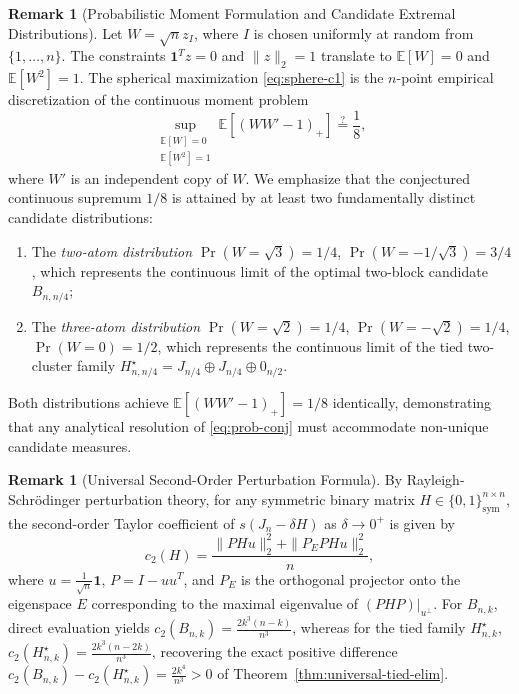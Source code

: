 \documentclass[11pt,reqno]{article}
\theoremstyle{definition}
\newtheorem{remark}[theorem]{Remark}
\newcommand{\one}{\mathbf{1}}
\begin{document}
\begin{itemize}
    \begin{remark}[Probabilistic Moment Formulation and Candidate Extremal Distributions]\label{rem:prob-c1}
    Let $W = \sqrt{n} z_I$, where $I$ is chosen uniformly at random from $\{1, \dots, n\}$. The constraints $\one^T z = 0$ and $\|z\|_2 = 1$ translate to $\mathbb{E}[W] = 0$ and $\mathbb{E}[W^2] = 1$. The spherical maximization \eqref{eq:sphere-c1} is the $n$-point empirical discretization of the continuous moment problem
    \begin{equation}\label{eq:prob-conj}
    \sup_{\substack{\mathbb{E}[W] = 0 \\ \mathbb{E}[W^2] = 1}} \mathbb{E}[(W W' - 1)_+] \stackrel{?}{=} \frac{1}{8},
    \end{equation}
    where $W'$ is an independent copy of $W$. We emphasize that the conjectured continuous supremum $1/8$ is attained by at least two fundamentally distinct candidate distributions:
    \begin{enumerate}
        \item The \emph{two-atom distribution} $\Pr(W = \sqrt{3}) = 1/4$, $\Pr(W = -1/\sqrt{3}) = 3/4$, which represents the continuous limit of the optimal two-block candidate $B_{n, n/4}$;
        \item The \emph{three-atom distribution} $\Pr(W = \sqrt{2}) = 1/4$, $\Pr(W = -\sqrt{2}) = 1/4$, $\Pr(W = 0) = 1/2$, which represents the continuous limit of the tied two-cluster family $H^\star_{n, n/4} = J_{n/4} \oplus J_{n/4} \oplus 0_{n/2}$.
    \end{enumerate}
    Both distributions achieve $\mathbb{E}[(W W' - 1)_+] = 1/8$ identically, demonstrating that any analytical resolution of \eqref{eq:prob-conj} must accommodate non-unique candidate measures.
    \end{remark}

    \begin{remark}[Universal Second-Order Perturbation Formula]\label{rem:second-order-gen}
    By Rayleigh-Schr\"odinger perturbation theory, for any symmetric binary matrix $H \in \{0, 1\}^{n \times n}_{\mathrm{sym}}$, the second-order Taylor coefficient of $s(J_n - \delta H)$ as $\delta \to 0^+$ is given by
    \begin{equation}\label{eq:c2-formula}
    c_2(H) = \frac{\|P H u\|_2^2 + \|P_E P H u\|_2^2}{n},
    \end{equation}
    where $u = \frac{1}{\sqrt{n}}\one$, $P = I - u u^T$, and $P_E$ is the orthogonal projector onto the eigenspace $E$ corresponding to the maximal eigenvalue of $(P H P)|_{u^\perp}$. For $B_{n, k}$, direct evaluation yields $c_2(B_{n, k}) = \frac{2k^3(n-k)}{n^3}$, whereas for the tied family $H^\star_{n, k}$, $c_2(H^\star_{n, k}) = \frac{2k^3(n-2k)}{n^3}$, recovering the exact positive difference $c_2(B_{n, k}) - c_2(H^\star_{n, k}) = \frac{2k^4}{n^3} > 0$ of Theorem~\ref{thm:universal-tied-elim}.
    \end{remark}


\end{itemize}
\end{document}
